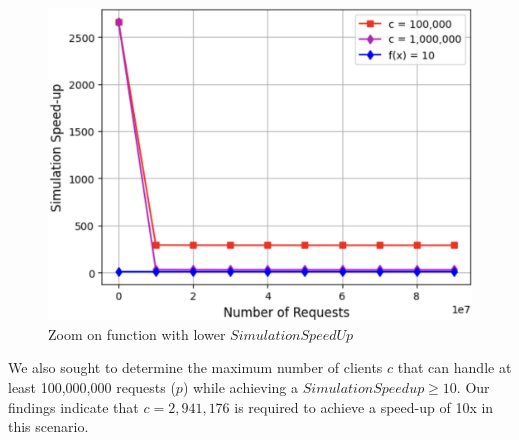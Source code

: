 \begin{figure}[H]
    \centering
    \includegraphics[width=\textwidth]{images/zoomgraph.png}
    \caption{Zoom on function with lower $SimulationSpeedUp$}
    \label{fig:perfZoom}
\end{figure}


We also sought to determine the maximum number of clients \( c \) that can handle at least 100,000,000 requests (\( p \)) while achieving a \( SimulationSpeedup \geq 10 \). Our findings indicate that \( c = 2,941,176 \) is required to achieve a speed-up of 10x in this scenario.


